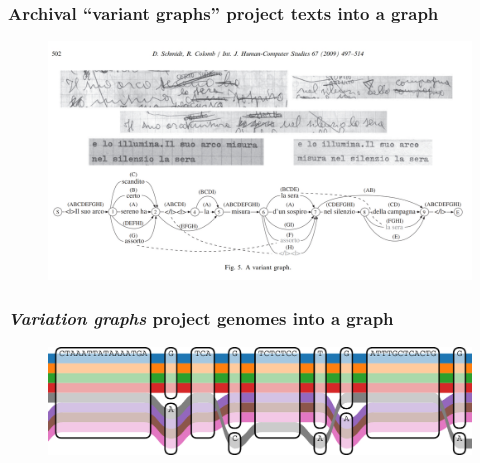 \documentclass{beamer}
\begin{document}
\begin{frame}
    \frametitle{Archival ``variant graphs'' project texts into a graph}

    \begin{figure}
      \includegraphics[scale=0.15]{text_variant_graph.jpg}
    \end{figure}
\end{frame}

\begin{frame}
    \frametitle{\emph{Variation graphs} project genomes into a graph}

    \begin{figure}
      \includegraphics[scale=1.2,center]{vg_tubemap.pdf}
    \end{figure}
\end{frame}
\end{document}
